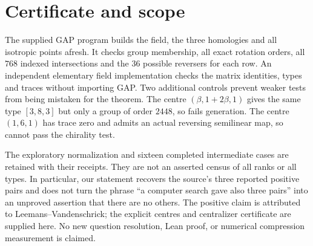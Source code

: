 \documentclass[11pt]{article}
\begin{document}
\section*{Certificate and scope}
The supplied GAP program builds the field, the three homologies and all
isotropic points afresh. It checks group membership, all exact rotation
orders, all $768$ indexed intersections and the $36$ possible reversers
for each row. An independent elementary field implementation checks the
matrix identities, types and traces without importing GAP.
Two additional controls prevent weaker tests from being mistaken for
the theorem. The centre $(\beta,1+2\beta,1)$ gives the same type
$[3,8,3]$ but only a group of order $2448$, so fails generation.
The centre $(1,6,1)$ has trace zero and admits an actual reversing
semilinear map, so cannot pass the chirality test.

The exploratory normalization and sixteen completed intermediate cases
are retained with their receipts. They are not an asserted census of
all ranks or all types. In particular, our statement recovers the
source's three reported positive pairs and does not turn the phrase
``a computer search gave also three pairs'' into an unproved assertion
that there are no others. The positive claim is attributed to
Leemans--Vandenschrick; the explicit centres and centralizer certificate
are supplied here. No new question resolution, Lean proof, or numerical
compression measurement is claimed.
\end{document}
